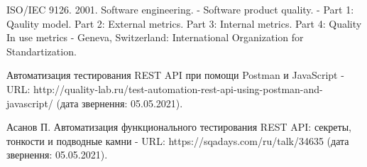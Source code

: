 \begin{thebibliography}{00}
      ISO/IEC 9126. 2001. Software engineering. -
      Software product quality. -
      Part 1: Qaulity model. 
      Part 2: External metrics. 
      Part 3: Internal metrics. 
      Part 4: Quality In use metrics -
      Geneva, Switzerland: International Organization for Standartization.

      Автоматизация тестирования REST API при помощи Postman и JavaScript -
      URL: http://quality-lab.ru/test-automation-rest-api-using-postman-and-javascript/
      (дата звернення: 05.05.2021).

      Асанов П.
      Автоматизация функционального тестирования REST API:
      секреты, тонкости и подводные камни -
      URL: https://sqadays.com/ru/talk/34635
      (дата звернення: 05.05.2021).

\end{thebibliography}
\endgroup

\clearpage
